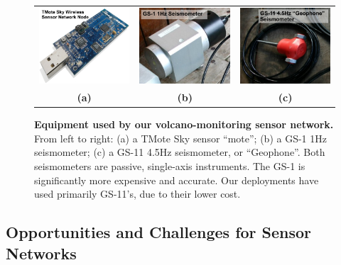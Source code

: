 \begin{figure}[t]
\begin{center}
\begin{tabular}{ccc}
\includegraphics[width=0.3\hsize]{./2-related/figs/TMoteSky.pdf} &
\includegraphics[width=0.3\hsize]{./2-related/figs/GS1.pdf} &
\includegraphics[width=0.3\hsize]{./2-related/figs/GS11.pdf} \\
\textbf{(a)} & \textbf{(b)} & \textbf{(c)} \\
\end{tabular}
\end{center}

\caption{\textbf{Equipment used by our volcano-monitoring sensor network.}
From left to right: (a) a TMote Sky sensor ``mote''; (b) a GS-1 1Hz
seismometer; (c) a GS-11 4.5Hz seismometer, or ``Geophone''. Both
seismometers are passive, single-axis instruments. The GS-1 is significantly
more expensive and accurate. Our deployments have used primarily GS-11's, due
to their lower cost.}

\label{introduction-fig-equipment}
\end{figure}

\vspace*{0.05in}

\subsection{Opportunities and Challenges for Sensor Networks}

